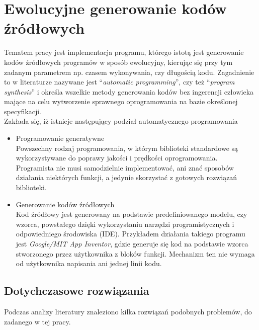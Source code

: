 \documentclass[twoside,a4paper,10]{book}
\begin{document}
\section{Ewolucyjne generowanie kodów źródłowych}
Tematem pracy jest implementacja programu, którego istotą jest generowanie kodów źródłowych programów  w sposób ewolucyjny, kierując się przy tym zadanym parametrem np. czasem wykonywania, czy długością kodu. Zagadnienie to w literaturze nazywane jest \enquote{\textit{automatic programming}}, czy też  \enquote{\textit{program synthesis}}  i określa wszelkie metody generowania kodów bez ingerencji człowieka mające na celu wytworzenie sprawnego oprogramowania na bazie określonej specyfikacji. 
\\ Zakłada się, iż istnieje następujący podział automatycznego programowania ~\cite{automaticProg} 
\begin{itemize}
\item Programowanie generatywne \\
	Powszechny rodzaj programowania, w którym biblioteki standardowe są wykorzystywane do poprawy jakości i prędkości oprogramowania. Programista nie musi samodzielnie implementować, ani znać sposobów działania niektórych funkcji, a jedynie skorzystać z gotowych rozwiązań biblioteki. 
\item Generowanie kodów źródłowych\\
 Kod źródłowy jest generowany na podstawie predefiniowanego modelu, czy wzorca, powstałego dzięki wykorzystaniu narzędzi programistycznych i odpowiedniego środowiska (IDE). Przykładem działania takiego programu jest \textit{Google/MIT App Inventor}, gdzie generuje się kod  na podstawie wzorca stworzonego przez użytkownika z bloków funkcji. Mechanizm ten nie wymaga od użytkownika napisania ani jednej linii kodu. 
\end{itemize}


\subsection{Dotychczasowe rozwiązania }
Podczas analizy literatury znaleziono kilka rozwiązań podobnych problemów, do zadanego w tej pracy. 
\end{document}
